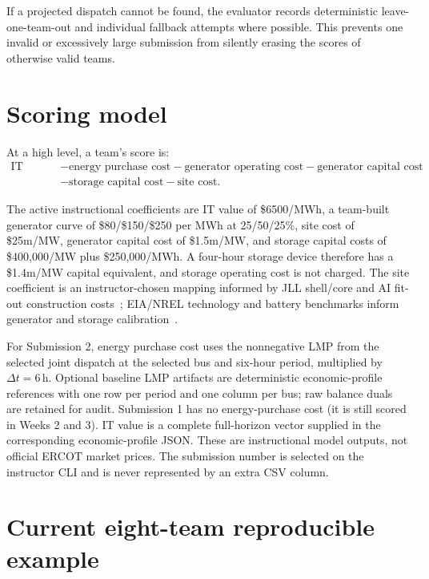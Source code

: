 \documentclass[12pt]{article}
\newcommand{\USD}{\$}
\begin{document}
If a projected dispatch cannot be found, the evaluator records
deterministic leave-one-team-out and individual fallback attempts where
possible. This prevents one invalid or excessively large submission from
silently erasing the scores of otherwise valid teams.

\section{Scoring model}

At a high level, a team's score is:
\begin{align*}
\text{IT value}
&-\text{energy purchase cost}
-\text{generator operating cost}
-\text{generator capital cost}
\\
&-\text{storage capital cost}
-\text{site cost}.
\end{align*}

The active instructional coefficients are IT value of \USD6500/MWh, a
team-built generator curve of \$80/\$150/\$250 per MWh at 25/50/25\%, site
cost of \USD25m/MW, generator capital cost of \USD1.5m/MW, and storage capital
costs of \USD400,000/MW plus \USD250,000/MWh. A four-hour storage device
therefore has a \USD1.4m/MW capital equivalent, and storage operating cost is
not charged. The site coefficient is an instructor-chosen mapping informed by
JLL shell/core and AI fit-out construction costs~\cite{jll2026dc}; EIA/NREL
technology and battery benchmarks inform generator and storage calibration~\cite{eia2024generatorcosts,eia2025heatrate,nrel2024bess,eia2024bess}.

For Submission 2, energy purchase cost uses the nonnegative LMP from the
selected joint dispatch at the selected bus and six-hour period, multiplied by
$\Delta t=6$\,h. Optional baseline LMP artifacts are deterministic
economic-profile references with one row per period and one column per bus; raw balance duals are retained for audit. Submission 1
has no energy-purchase cost (it is still scored in Weeks 2 and 3). IT value is a complete
full-horizon vector supplied in the corresponding economic-profile JSON. These
are instructional model outputs, not official ERCOT market prices. The
submission number is selected on the instructor CLI and is never represented by
an extra CSV column.

\section{Current eight-team reproducible example}
\end{document}
